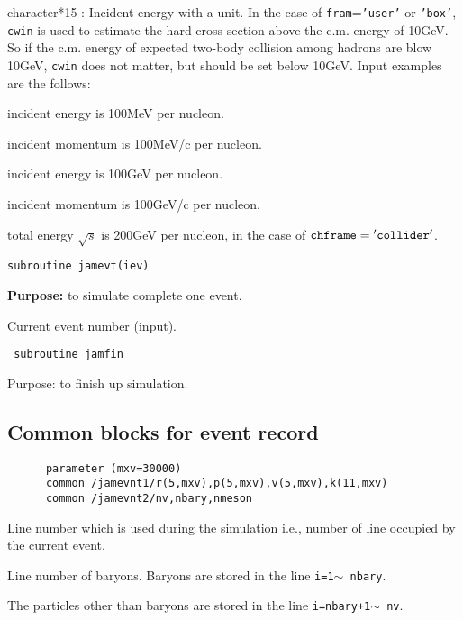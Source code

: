 \documentclass[]{article}
\newenvironment{entry}%
{\begin{list}{}{\setlength{\topsep}{0mm} \setlength{\itemsep}{0mm}
\setlength{\parskip}{0mm} \setlength{\parsep}{0mm}
\setlength{\leftmargin}{20mm} \setlength{\rightmargin}{0mm}
\setlength{\labelwidth}{18mm} \setlength{\labelsep}{2mm}}}%
{\end{list}}
\newenvironment{subentry}%
{\begin{list}{}{\setlength{\topsep}{0mm} \setlength{\itemsep}{0mm}
\setlength{\parskip}{0mm} \setlength{\parsep}{0mm}
\setlength{\leftmargin}{10mm} \setlength{\rightmargin}{0mm}
\setlength{\labelwidth}{18mm} \setlength{\labelsep}{2mm}}}%
{\end{list}}
\newcommand{\ttt}[1]{{\tt#1}}
\newcommand{\itemt}[1]{\item[{\tt #1}\hfill]}
\newcommand{\iteme}[1]{\item[{\tt #1}]}
\begin{document}
\begin{entry}
\iteme{cwin:} character*15 : Incident energy with a unit.
 In the case of \ttt{fram}=\ttt{'user'} or \ttt{'box'}, \ttt{cwin}
is used to estimate the hard cross section above the c.m. energy
of 10GeV. So if the c.m. energy of expected two-body collision
among hadrons are blow 10GeV, \ttt{cwin} does not matter, but
should be set below 10GeV.
    Input examples are the follows:
 \begin{subentry}
  \iteme{'100mev':}  incident energy is 100MeV per nucleon.
  \iteme{'100mevc':} incident momentum is 100MeV/c per nucleon.
  \iteme{'100gev':}  incident energy is 100GeV per nucleon.
  \iteme{'100gevc':} incident momentum is 100GeV/c per nucleon.
  \iteme{'200gev':}  total energy $\sqrt{s}$ is 200GeV per nucleon,
                     in the case of ${\tt chframe}={\tt 'collider'}$.
 \end{subentry}
\end{entry}


\begin{verbatim}
subroutine jamevt(iev)
\end{verbatim}
{\bf Purpose:} to simulate complete one event.
\begin{entry}
 \iteme{iev:} Current event number (input).
\end{entry}

\begin{verbatim} subroutine jamfin \end{verbatim} {Purpose:} to finish up
simulation.





\subsection{Common blocks for event record}

\begin{verbatim}
      parameter (mxv=30000)
      common /jamevnt1/r(5,mxv),p(5,mxv),v(5,mxv),k(11,mxv)
      common /jamevnt2/nv,nbary,nmeson
\end{verbatim}

\begin{entry}
\itemt{nv:}    Line number which is used during the simulation
               i.e., number of line occupied by the current event.
\itemt{nbary:}  Line number of baryons. Baryons are stored in the
                line \ttt{i=1$\sim$ nbary}.
\itemt{nmeson:}  The particles other than baryons  are stored in the
                line \ttt{i=nbary+1$\sim$ nv}.
\end{entry}
\end{document}
